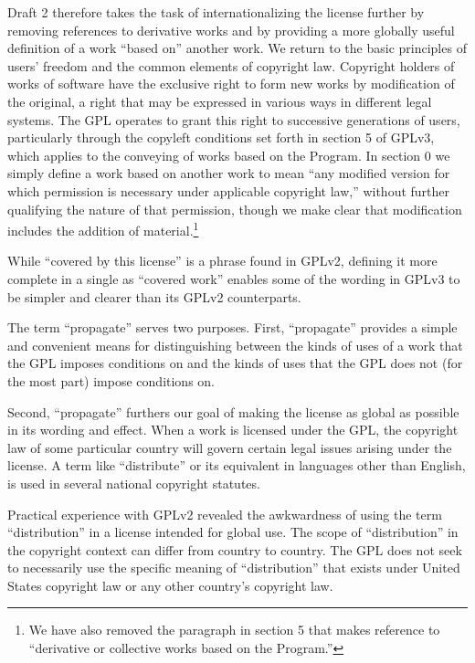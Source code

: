 
Draft 2 therefore takes the task of internationalizing the license
further by removing references to derivative works and by providing a
more globally useful definition of a work ``based on'' another work.
We return to the basic principles of users' freedom and the common
elements of copyright law.  Copyright holders of works of software
have the exclusive right to form new works by modification of the
original, a right that may be expressed in various ways in different
legal systems.  The GPL operates to grant this right to successive
generations of users, particularly through the copyleft conditions set
forth in section 5 of GPLv3, which applies to the conveying of works
based on the Program.  In section 0 we simply define a work based on
another work to mean ``any modified version for which permission is
necessary under applicable copyright law,'' without further qualifying
the nature of that permission, though we make clear that modification
includes the addition of material.\footnote{We have also removed the
paragraph in section 5 that makes reference to ``derivative or
collective works based on the Program.''}


While ``covered by this license'' is a phrase found in GPLv2, defining it
more complete in a single as ``covered work'' enables some of the wording in
GPLv3 to be simpler and clearer than its GPLv2 counterparts.


The term ``propagate'' serves two purposes.  First, ``propagate'' provides a
simple and convenient means for distinguishing between the kinds of uses of a
work that the GPL imposes conditions on and the kinds of uses that the GPL
does not (for the most part) impose conditions on.

Second, ``propagate'' furthers our goal of making the license as global as
possible in its wording and effect.  When a work is licensed under the GPL,
the copyright law of some particular country will govern certain legal issues
arising under the license.  A term like ``distribute'' or its equivalent in
languages other than English, is used in several national copyright statutes.

Practical experience with GPLv2 revealed the awkwardness of using the
term ``distribution'' in a license intended for global use.  
The scope of ``distribution'' in the copyright context can differ from
country to country.  The GPL does not seek to necessarily use the specific
meaning of ``distribution'' that exists under United States copyright law or
any other country's copyright law.


